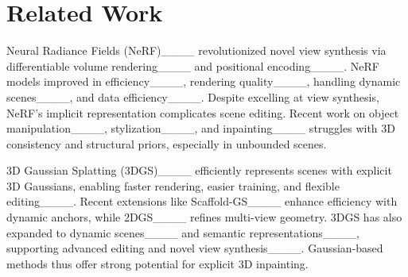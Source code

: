 \section{Related Work}
\label{sec:related}


Neural Radiance Fields (NeRF)____ revolutionized novel view synthesis via differentiable volume rendering____ and positional encoding____. NeRF models improved in efficiency____, rendering quality____, handling dynamic scenes____, and data efficiency____. Despite excelling at view synthesis, NeRF’s implicit representation complicates scene editing. Recent work on object manipulation____, stylization____, and inpainting____ struggles with 3D consistency and structural priors, especially in unbounded scenes.


\vspace{3pt}
3D Gaussian Splatting (3DGS)____ efficiently represents scenes with explicit 3D Gaussians, enabling faster rendering, easier training, and flexible editing____. Recent extensions like Scaffold-GS____ enhance efficiency with dynamic anchors, while 2DGS____ refines multi-view geometry. 3DGS has also expanded to dynamic scenes____ and semantic representations____, supporting advanced editing and novel view synthesis____. Gaussian-based methods thus offer strong potential for explicit 3D inpainting.

